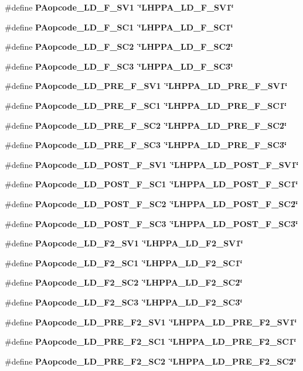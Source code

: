 \begin{CompactItemize}
\#define \bf{PAopcode\_\-LD\_\-F\_\-SV1}~\char`\"{}LHPPA\_\-LD\_\-F\_\-SV1\char`\"{}
\item 
\#define \bf{PAopcode\_\-LD\_\-F\_\-SC1}~\char`\"{}LHPPA\_\-LD\_\-F\_\-SC1\char`\"{}
\item 
\#define \bf{PAopcode\_\-LD\_\-F\_\-SC2}~\char`\"{}LHPPA\_\-LD\_\-F\_\-SC2\char`\"{}
\item 
\#define \bf{PAopcode\_\-LD\_\-F\_\-SC3}~\char`\"{}LHPPA\_\-LD\_\-F\_\-SC3\char`\"{}
\item 
\#define \bf{PAopcode\_\-LD\_\-PRE\_\-F\_\-SV1}~\char`\"{}LHPPA\_\-LD\_\-PRE\_\-F\_\-SV1\char`\"{}
\item 
\#define \bf{PAopcode\_\-LD\_\-PRE\_\-F\_\-SC1}~\char`\"{}LHPPA\_\-LD\_\-PRE\_\-F\_\-SC1\char`\"{}
\item 
\#define \bf{PAopcode\_\-LD\_\-PRE\_\-F\_\-SC2}~\char`\"{}LHPPA\_\-LD\_\-PRE\_\-F\_\-SC2\char`\"{}
\item 
\#define \bf{PAopcode\_\-LD\_\-PRE\_\-F\_\-SC3}~\char`\"{}LHPPA\_\-LD\_\-PRE\_\-F\_\-SC3\char`\"{}
\item 
\#define \bf{PAopcode\_\-LD\_\-POST\_\-F\_\-SV1}~\char`\"{}LHPPA\_\-LD\_\-POST\_\-F\_\-SV1\char`\"{}
\item 
\#define \bf{PAopcode\_\-LD\_\-POST\_\-F\_\-SC1}~\char`\"{}LHPPA\_\-LD\_\-POST\_\-F\_\-SC1\char`\"{}
\item 
\#define \bf{PAopcode\_\-LD\_\-POST\_\-F\_\-SC2}~\char`\"{}LHPPA\_\-LD\_\-POST\_\-F\_\-SC2\char`\"{}
\item 
\#define \bf{PAopcode\_\-LD\_\-POST\_\-F\_\-SC3}~\char`\"{}LHPPA\_\-LD\_\-POST\_\-F\_\-SC3\char`\"{}
\item 
\#define \bf{PAopcode\_\-LD\_\-F2\_\-SV1}~\char`\"{}LHPPA\_\-LD\_\-F2\_\-SV1\char`\"{}
\item 
\#define \bf{PAopcode\_\-LD\_\-F2\_\-SC1}~\char`\"{}LHPPA\_\-LD\_\-F2\_\-SC1\char`\"{}
\item 
\#define \bf{PAopcode\_\-LD\_\-F2\_\-SC2}~\char`\"{}LHPPA\_\-LD\_\-F2\_\-SC2\char`\"{}
\item 
\#define \bf{PAopcode\_\-LD\_\-F2\_\-SC3}~\char`\"{}LHPPA\_\-LD\_\-F2\_\-SC3\char`\"{}
\item 
\#define \bf{PAopcode\_\-LD\_\-PRE\_\-F2\_\-SV1}~\char`\"{}LHPPA\_\-LD\_\-PRE\_\-F2\_\-SV1\char`\"{}
\item 
\#define \bf{PAopcode\_\-LD\_\-PRE\_\-F2\_\-SC1}~\char`\"{}LHPPA\_\-LD\_\-PRE\_\-F2\_\-SC1\char`\"{}
\item 
\#define \bf{PAopcode\_\-LD\_\-PRE\_\-F2\_\-SC2}~\char`\"{}LHPPA\_\-LD\_\-PRE\_\-F2\_\-SC2\char`\"{}

\end{CompactItemize}

